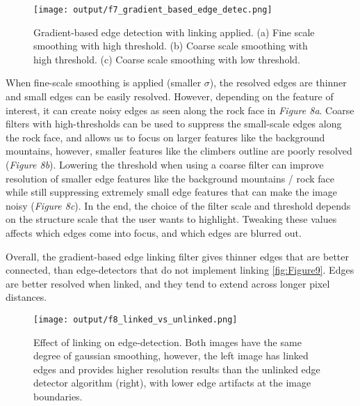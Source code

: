 \documentclass[12pt]{report}
\begin{document}
\begin{enumerate}
    \begin{figure}[H]
        \centering
        \texttt{[image: output/f7\_gradient\_based\_edge\_detec.png]}
        \caption{Gradient-based edge detection with linking applied. (a) Fine scale smoothing with high threshold. (b) Coarse scale smoothing with high threshold. (c) Coarse scale 
        smoothing with low threshold.}
        \label{fig:Figure8}
    \end{figure}

    When fine-scale smoothing is applied (smaller $\sigma$), the resolved edges are thinner and small edges can be easily resolved. However, depending on the feature of interest, it 
    can create noisy edges as seen along the rock face in \emph{Figure 8a}. Coarse filters with high-thresholds can be used to suppress the small-scale edges along the rock face, and 
    allows us to focus on larger features like the background mountains, however, smaller features like the climbers outline are poorly resolved (\emph{Figure 8b}). Lowering the 
    threshold when using a coarse filter can improve resolution of smaller edge features like the background mountains / rock face while still suppressing extremely small edge features 
    that can make the image noisy (\emph{Figure 8c}). In the end, the choice of the filter scale and threshold depends on the structure scale that the user wants to highlight. Tweaking 
    these values affects which edges come into focus, and which edges are blurred out.  
    
    Overall, the gradient-based edge linking filter gives thinner edges that are better connected, than edge-detectors that do not implement linking \autoref{fig:Figure9}. Edges 
    are better resolved when linked, and they tend to extend across longer pixel distances.

    \begin{figure}[H]
        \centering
        \texttt{[image: output/f8\_linked\_vs\_unlinked.png]}
        \caption{Effect of linking on edge-detection. Both images have the same degree of gaussian smoothing, however, the left image has linked edges and provides higher resolution 
        results than the unlinked edge detector algorithm (right), with lower edge artifacts at the image boundaries.}
        \label{fig:Figure9}
    \end{figure}


    

\end{enumerate}
\end{document}
